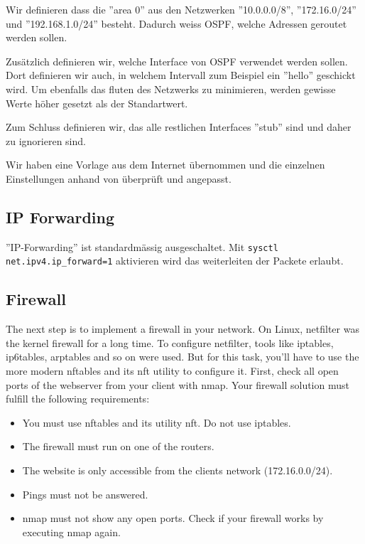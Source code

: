\documentclass[11pt,titlepage]{article}
\newenvironment{shadedquotation}
 {\begin{shaded*}
  \quoting[leftmargin=0pt, vskip=0pt]
 }
 {\endquoting
 \end{shaded*}
}
\begin{document}
Wir definieren dass die ''area 0'' aus den Netzwerken ''10.0.0.0/8'', ''172.16.0/24'' und ''192.168.1.0/24'' besteht. Dadurch weiss OSPF, welche Adressen geroutet werden sollen.

Zusätzlich definieren wir, welche Interface von OSPF verwendet werden sollen. Dort definieren wir auch, in welchem Intervall zum Beispiel ein ''hello'' geschickt wird.
Um ebenfalls das fluten des Netzwerks zu minimieren, werden gewisse Werte höher gesetzt als der Standartwert.

Zum Schluss definieren wir, das alle restlichen Interfaces ''stub'' sind und daher zu ignorieren sind.

\medskip
Wir haben eine Vorlage aus dem Internet übernommen \cite{BIRD_EXAMPLE} und die einzelnen Einstellungen anhand von \cite{BIRD_DOC} überprüft und angepasst.

\subsection{IP Forwarding}
\label{subsec:IPForwarding}

''IP-Forwarding'' ist standardmässig ausgeschaltet. Mit \lstinline!sysctl net.ipv4.ip_forward=1! aktivieren wird das weiterleiten der Packete erlaubt.

\subsection{Firewall}
\label{subsec:Firewall}
\begin{shadedquotation}
	The next step is to implement a firewall in your network. On Linux, netfilter was the kernel
	firewall for a long time. To configure netfilter, tools like iptables, ip6tables, arptables and so
	on were used. But for this task, you’ll have to use the more modern nftables and its nft utility
	to configure it.
	First, check all open ports of the webserver from your client with nmap. Your firewall solution
	must fulfill the following requirements:
	\begin{itemize}
		\item You must use nftables and its utility nft. Do not use iptables.
		\item The firewall must run on one of the routers.
		\item The website is only accessible from the clients network (172.16.0.0/24).
		\item Pings must not be answered.
		\item nmap must not show any open ports. Check if your firewall works by executing nmap again.
	\end{itemize}
\end{shadedquotation}
\end{document}
